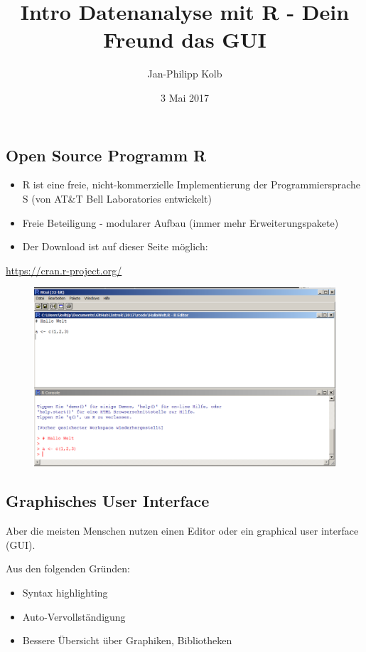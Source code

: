 \documentclass[]{article}
\title{Intro Datenanalyse mit R - Dein Freund das GUI}
\author{Jan-Philipp Kolb}
\date{3 Mai 2017}
\providecommand{\tightlist}{%
  \setlength{\itemsep}{0pt}\setlength{\parskip}{0pt}}
\begin{document}
\maketitle

\subsection{Open Source Programm R}\label{open-source-programm-r}

\begin{itemize}
\item
  R ist eine freie, nicht-kommerzielle Implementierung der
  Programmiersprache S (von AT\&T Bell Laboratories entwickelt)
\item
  Freie Beteiligung - modularer Aufbau (immer mehr Erweiterungspakete)
\item
  Der Download ist auf dieser Seite möglich:
\end{itemize}

\url{https://cran.r-project.org/}

\begin{figure}[htbp]
\centering
\includegraphics{figure/BasisR.PNG}
\caption{}
\end{figure}

\subsection{Graphisches User
Interface}\label{graphisches-user-interface}

Aber die meisten Menschen nutzen einen Editor oder ein graphical user
interface (GUI).

Aus den folgenden Gründen:

\begin{itemize}
\tightlist
\item
  Syntax highlighting
\item
  Auto-Vervollständigung
\item
  Bessere Übersicht über Graphiken, Bibliotheken
\end{itemize}
\end{document}
